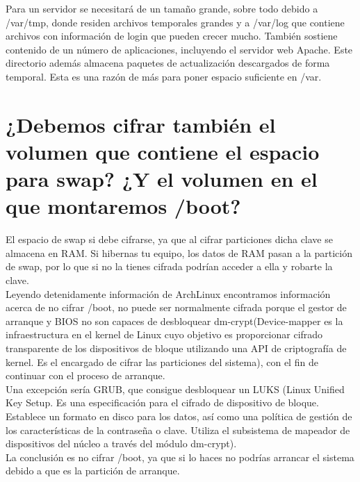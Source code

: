 	Para un servidor se necesitará de un tamaño grande\cite{veintidos}, sobre todo debido a /var/tmp, donde residen archivos temporales grandes y a /var/log que contiene archivos con información de login que pueden crecer mucho. También sostiene contenido de un número de aplicaciones, incluyendo el servidor web Apache. Este directorio además almacena paquetes de actualización descargados de forma temporal. Esta es una razón de más para poner espacio suficiente en /var.
	
	
	\section{¿Debemos cifrar también el volumen que contiene el espacio para swap? ¿Y el volumen en el que montaremos /boot?}
	
	El espacio de swap si debe cifrarse\cite{veintitres}, ya que al cifrar particiones dicha clave se almacena en RAM.  Si hibernas tu equipo, los datos de RAM pasan a la partición de swap, por lo que si no la tienes cifrada podrían acceder a ella y robarte la clave.
	\\
	
	Leyendo detenidamente información de ArchLinux\cite{veinticuatro,veinticinco} encontramos información acerca de no cifrar /boot, no puede ser normalmente cifrada porque el gestor de arranque y BIOS no son capaces de desbloquear dm-crypt\cite{veintiseis}(Device-mapper es la infraestructura en el kernel de Linux cuyo objetivo es proporcionar cifrado transparente de los dispositivos de bloque utilizando una API de criptografía de kernel. Es el encargado de cifrar las particiones del sistema), con el fin de continuar con el proceso de arranque. 
	\\
	
	Una excepción sería GRUB, que consigue desbloquear un LUKS \cite{veintisiete}(Linux Unified Key Setup. Es una especificación para el cifrado de dispositivo de bloque. Establece un formato en disco para los datos, así como una política de gestión de los características de la contraseña o clave. Utiliza el subsistema de mapeador de dispositivos del núcleo a través del módulo dm-crypt). 
	\\
	
	La conclusión es no cifrar /boot, ya que si lo haces no podrías arrancar el sistema debido a que es la partición de arranque.
	
